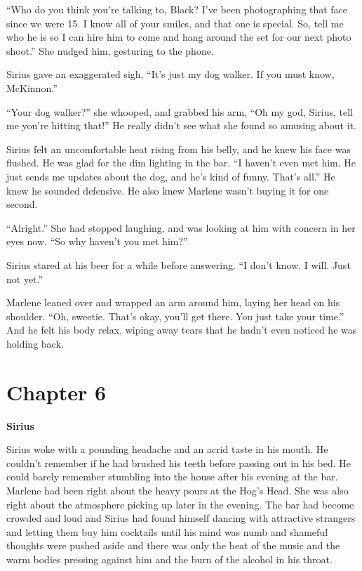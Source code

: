 \documentclass[12pt,twoside,openright]{memoir}
\begin{document}
``Who do you think you're talking to, Black? I've been photographing that face since we were 15. I know all of your smiles, and that one is special. So, tell me who he is so I can hire him to come and hang around the set for our next photo shoot.'' She nudged him, gesturing to the phone.

Sirius gave an exaggerated sigh, ``It's just my dog walker. If you must know, McKinnon.''

``Your dog walker?'' she whooped, and grabbed his arm, ``Oh my god, Sirius, tell me you're hitting that!'' He really didn't see what she found so amusing about it.

Sirius felt an uncomfortable heat rising from his belly, and he knew his face was flushed. He was glad for the dim lighting in the bar. ``I haven't even met him. He just sends me updates about the dog, and he's kind of funny. That's all.'' He knew he sounded defensive. He also knew Marlene wasn't buying it for one second. 

``Alright.'' She had stopped laughing, and was looking at him with concern in her eyes now. ``So why haven't you met him?''

Sirius stared at his beer for a while before answering. ``I don't know. I will. Just not yet.''

Marlene leaned over and wrapped an arm around him, laying her head on his shoulder. ``Oh, sweetie. That's okay, you'll get there. You just take your time.'' And he felt his body relax, wiping away tears that he hadn't even noticed he was holding back.

\chapter*{Chapter 6}

\textbf{Sirius} 

Sirius woke with a pounding headache and an acrid taste in his mouth. He couldn't remember if he had brushed his teeth before passing out in his bed. He could barely remember stumbling into the house after his evening at the bar. Marlene had been right about the heavy pours at the Hog's Head. She was also right about the atmosphere picking up later in the evening. The bar had become crowded and loud and Sirius had found himself dancing with attractive strangers and letting them buy him cocktails until his mind was numb and shameful thoughts were pushed aside and there was only the beat of the music and the warm bodies pressing against him and the burn of the alcohol in his throat.
\end{document}
